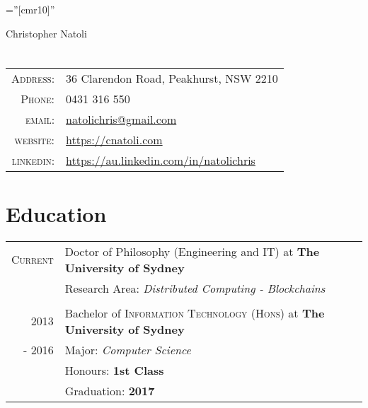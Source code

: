 \documentclass[10pt]{article}
\begin{document}

\pagestyle{empty} %

\font\fb=''[cmr10]'' %

\par{\centering
		{\Huge Christopher Natoli
	}\bigskip\par}

\vspace*{-0.6cm}
\section{}

\begin{tabular}{rl}
    \textsc{Address:}   & 36 Clarendon Road, Peakhurst, NSW 2210\\
    \textsc{Phone:}     & 0431 316 550\\
    \textsc{email:}     & \href{natolichris@gmail.com}{natolichris@gmail.com} \\
    \textsc{website:} & \href{https://cnatoli.com}{https://cnatoli.com}\\
    \textsc{linkedin:} & \href{https://au.linkedin.com/in/natolichris}{https://au.linkedin.com/in/natolichris} \\
\end{tabular}
\vspace*{0.3cm}
%
%
%
%
\section{Education}
\begin{tabular}{rl}	
\textsc{Current} & Doctor of Philosophy (Engineering and IT) at \textbf{The University of Sydney} \\
	& Research Area: \emph{Distributed Computing - Blockchains}\\\multicolumn{2}{c}{}\\
2013 & Bachelor of \textsc{Information Technology (Hons)} at \textbf{The University of Sydney} \\
- 2016 & Major: \emph{Computer Science}\\
	& Honours: \textbf{1st Class}\\
& Graduation: \textbf{2017}\\

\end{tabular}
\end{document}
